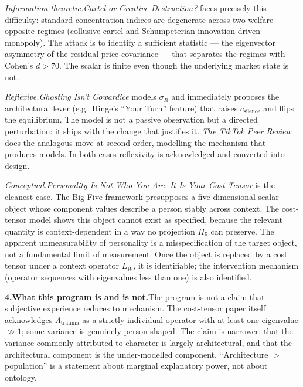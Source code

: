 \documentclass[11pt]{article}
\begin{document}
\medskip\noindent\textit{Information-theoretic.}\quad \textit{Cartel or
Creative Destruction?} faces precisely this difficulty: standard
concentration indices are degenerate across two welfare-opposite regimes
(collusive cartel and Schumpeterian innovation-driven monopoly). The attack
is to identify a sufficient statistic --- the eigenvector asymmetry of the
residual price covariance --- that separates the regimes with
Cohen's $d > 70$. The scalar is finite even though the underlying market
state is not.

\medskip\noindent\textit{Reflexive.}\quad \textit{Ghosting Isn't Cowardice}
models $\sigma_R$ and immediately proposes the architectural lever (e.g.\
Hinge's ``Your Turn'' feature) that raises $c_{\text{silence}}$ and flips
the equilibrium. The model is not a passive observation but a directed
perturbation: it ships with the change that justifies it. \textit{The
TikTok Peer Review} does the analogous move at second order, modelling the
mechanism that produces models. In both cases reflexivity is acknowledged
and converted into design.

\newpage

\noindent\textit{Conceptual.}\quad \textit{Personality Is Not Who You Are.
It Is Your Cost Tensor} is the cleanest case. The Big Five framework
presupposes a five-dimensional scalar object whose component values
describe a person stably across context. The cost-tensor model shows this
object cannot exist as specified, because the relevant quantity is
context-dependent in a way no projection $\Pi_5$ can preserve. The apparent
unmeasurability of personality is a misspecification of the target object,
not a fundamental limit of measurement. Once the object is replaced by a
cost tensor under a context operator $L_W$, it is identifiable; the
intervention mechanism (operator sequences with eigenvalues less than one)
is also identified.

\bigskip\noindent\textbf{4.\quad What this program is and is not.}\quad The
program is not a claim that subjective experience reduces to mechanism. The
cost-tensor paper itself acknowledges $\Lambda_{\text{trauma}}$ as a
strictly individual operator with at least one eigenvalue $\gg 1$; some
variance is genuinely person-shaped. The claim is narrower: that the
variance commonly attributed to character is largely architectural, and
that the architectural component is the under-modelled component.
``Architecture $>$ population'' is a statement about marginal explanatory
power, not about ontology.
\end{document}
